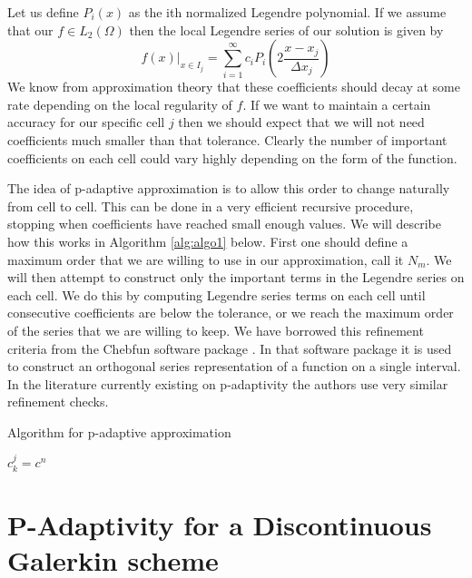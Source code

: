 \documentclass[10]{amsart}
\begin{document}
Let us define $P_i(x)$ as the ith normalized Legendre polynomial. If we assume that our $f \in L_2 (\Omega)$
then the local Legendre series of our solution is given by 
$$f(x)|_{x \in I_j}=\sum_{i=1}^\infty c_i P_i(2\frac{x-x_j}{\Delta x_j})$$
We know from approximation theory that these coefficients should decay at some rate
depending on the local regularity of $f$. If we want to maintain a certain
accuracy for our specific cell $j$ then we should expect that we will not need coefficients much smaller than that
tolerance.
Clearly the number of important coefficients on each cell
could vary highly depending on the form of the function.

The idea of p-adaptive approximation is to allow this order to change naturally from cell to cell. This can be done in a 
very efficient recursive procedure, stopping when coefficients have reached small enough values. 
We will describe how this works in Algorithm \ref{alg:algo1} below.
First one should define a maximum order that we are willing to use in our approximation, call it $N_m$. We will
then attempt to construct only the important terms in the Legendre series on each cell. We do this by computing Legendre
series terms on each cell until consecutive coefficients are below the tolerance, or we reach the maximum order
of the series that we are willing to keep. We have borrowed this refinement criteria from the Chebfun software package
\cite{trefethen2013approximation}.
In that software package it is used to construct an orthogonal series representation of a function on a single interval.
In the literature currently existing on p-adaptivity\cite{tumolo2013semi,eskilsson2011hp} the authors use very similar
refinement checks. 

\begin{algorithm}
\caption{Algorithm for p-adaptive approximation}
\begin{algorithmic}[1]
    \State $c^j_k=c^n$
  \EndWhile
\EndFor
\end{algorithmic}\label{alg:algo1}
\end{algorithm}

\section{P-Adaptivity for a Discontinuous Galerkin scheme}
\end{document}
